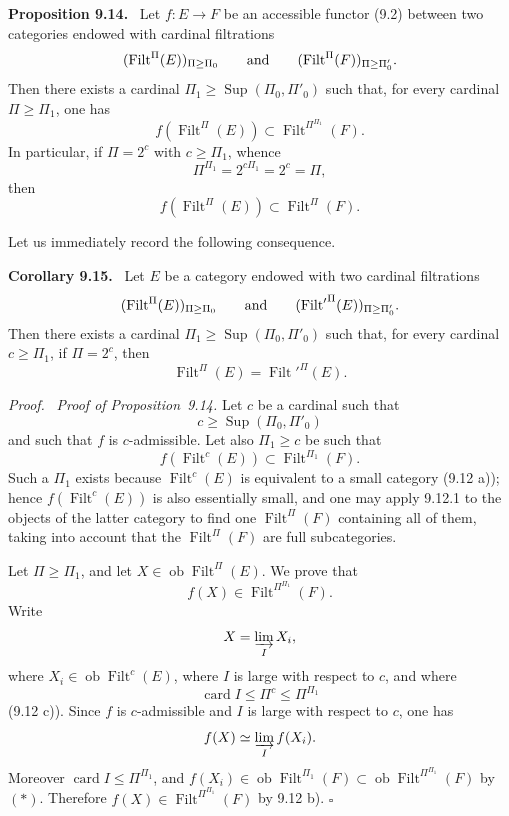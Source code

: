 \documentclass[11pt]{article}
\newcommand{\ob}{\operatorname{ob}}
\newcommand{\Filt}{\operatorname{Filt}}
\newcommand{\Sup}{\operatorname{Sup}}
\newcommand{\card}{\operatorname{card}}
\newcommand{\qedtext}{\hfill\(\square\)}
\newenvironment{statement}[1]{\par\medskip\noindent\textbf{#1.}\ }{\par\medskip}
\newenvironment{prooftext}{\par\noindent\emph{Proof.}\ }{\par\medskip}
\begin{document}
\begin{statement}{Proposition 9.14}
Let $f:E\to F$ be an accessible functor (9.2) between two categories endowed with cardinal filtrations
\[
(\Filt^\Pi(E))_{\Pi\geq\Pi_0}\qquad\hbox{and}\qquad
(\Filt^\Pi(F))_{\Pi\geq\Pi'_0}.
\]
Then there exists a cardinal $\Pi_1\geq \Sup(\Pi_0,\Pi'_0)$ such that, for every cardinal $\Pi\geq \Pi_1$, one has
\begin{equation}
 f(\Filt^\Pi(E))\subset \Filt^{\Pi^{\Pi_1}}(F).
 \tag{9.14.1}
\end{equation}
In particular, if $\Pi=2^c$ with $c\geq \Pi_1$, whence
\[
 \Pi^{\Pi_1}=2^{c\Pi_1}=2^c=\Pi,
\]
then
\begin{equation}
 f(\Filt^\Pi(E))\subset \Filt^\Pi(F).
 \tag{9.14.2}
\end{equation}
\end{statement}

Let us immediately record the following consequence.

\begin{statement}{Corollary 9.15}
Let $E$ be a category endowed with two cardinal filtrations
\[
(\Filt^\Pi(E))_{\Pi\geq\Pi_0}
\qquad\hbox{and}\qquad
({\Filt'}^\Pi(E))_{\Pi\geq\Pi'_0}.
\]
Then there exists a cardinal $\Pi_1\geq \Sup(\Pi_0,\Pi'_0)$ such that, for every cardinal $c\geq\Pi_1$, if $\Pi=2^c$, then
\[
 \Filt^\Pi(E)={\Filt'}^\Pi(E).
\]
\end{statement}

\begin{prooftext}
\emph{Proof of Proposition~9.14.}
Let $c$ be a cardinal such that
\[
 c\geq\Sup(\Pi_0,\Pi'_0)
\]
and such that $f$ is $c$-admissible. Let also $\Pi_1\geq c$ be such that
\begin{equation}
 f(\Filt^c(E))\subset \Filt^{\Pi_1}(F).
 \tag{$\ast$}
\end{equation}
Such a $\Pi_1$ exists because $\Filt^c(E)$ is equivalent to a small category (9.12 a)); hence $f(\Filt^c(E))$ is also essentially small, and one may apply 9.12.1 to the objects of the latter category to find one $\Filt^\Pi(F)$ containing all of them, taking into account that the $\Filt^\Pi(F)$ are full subcategories.

Let $\Pi\geq\Pi_1$, and let $X\in\ob\Filt^\Pi(E)$. We prove that
\[
 f(X)\in \Filt^{\Pi^{\Pi_1}}(F).
\]
Write
\[
 X=\varinjlim_I X_i,
\]
where $X_i\in\ob\Filt^c(E)$, where $I$ is large with respect to $c$, and where
\[
 \card I\leq \Pi^c\leq \Pi^{\Pi_1}
\]
(9.12 c)). Since $f$ is $c$-admissible and $I$ is large with respect to $c$, one has
\[
 f(X)\simeq \varinjlim_I f(X_i).
\]
Moreover $\card I\leq \Pi^{\Pi_1}$, and $f(X_i)\in\ob\Filt^{\Pi_1}(F)\subset\ob\Filt^{\Pi^{\Pi_1}}(F)$ by $(\ast)$. Therefore $f(X)\in\Filt^{\Pi^{\Pi_1}}(F)$ by 9.12 b). \qedtext
\end{prooftext}
\end{document}
